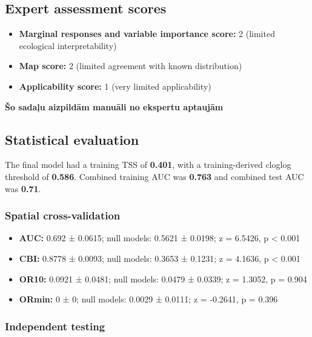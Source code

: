 \documentclass[
  openany]{book}
\providecommand{\tightlist}{%
  \setlength{\itemsep}{0pt}\setlength{\parskip}{0pt}}
\providecommand{\tightlist}{%
  \setlength{\itemsep}{0pt}%
  \setlength{\parskip}{0pt}%
}
\begin{document}
\subsection*{Expert assessment scores}\label{expert-assessment-scores-10}

\begin{itemize}
\tightlist
\item
  \textbf{Marginal responses and variable importance score:} 2 (limited ecological interpretability)
\item
  \textbf{Map score:} 2 (limited agreement with known distribution)
\item
  \textbf{Applicability score:} 1 (very limited applicability)
\end{itemize}

\textbf{Šo sadaļu aizpildām manuāli no ekspertu aptaujām}

\subsection*{Statistical evaluation}\label{statistical-evaluation-10}

The final model had a training TSS of \textbf{0.401}, with a training-derived cloglog threshold of \textbf{0.586}. Combined training AUC was \textbf{0.763} and combined test AUC was \textbf{0.71}.

\subsubsection*{Spatial cross-validation}\label{spatial-cross-validation-10}

\begin{itemize}
\tightlist
\item
  \textbf{AUC:} 0.692 ± 0.0615; null models: 0.5621 ± 0.0198; z = 6.5426, p \textless{} 0.001
\item
  \textbf{CBI:} 0.8778 ± 0.0093; null models: 0.3653 ± 0.1231; z = 4.1636, p \textless{} 0.001
\item
  \textbf{OR10:} 0.0921 ± 0.0481; null models: 0.0479 ± 0.0339; z = 1.3052, p = 0.904
\item
  \textbf{ORmin:} 0 ± 0; null models: 0.0029 ± 0.0111; z = -0.2641, p = 0.396
\end{itemize}

\subsubsection*{Independent testing}\label{independent-testing-10}
\end{document}
